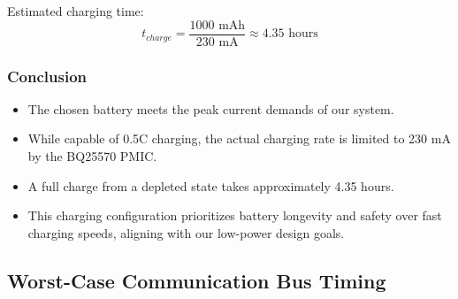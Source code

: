 \documentclass[a4paper,11pt]{article}%
\begin{document}
Estimated charging time:
\begin{equation}
    t_{charge} = \frac{1000 \text{ mAh}}{230 \text{ mA}} \approx 4.35 \text{ hours}
\end{equation}

\subsubsection{Conclusion}


\begin{itemize}
    \item The chosen battery meets the peak current demands of our system.
    \item While capable of 0.5C charging, the actual charging rate is limited to 230 mA by the BQ25570 PMIC.
    \item A full charge from a depleted state takes approximately 4.35 hours.
    \item This charging configuration prioritizes battery longevity and safety over fast charging speeds, aligning with our low-power design goals.
\end{itemize}


\pagebreak

\subsection{Worst-Case Communication Bus Timing}
\end{document}
